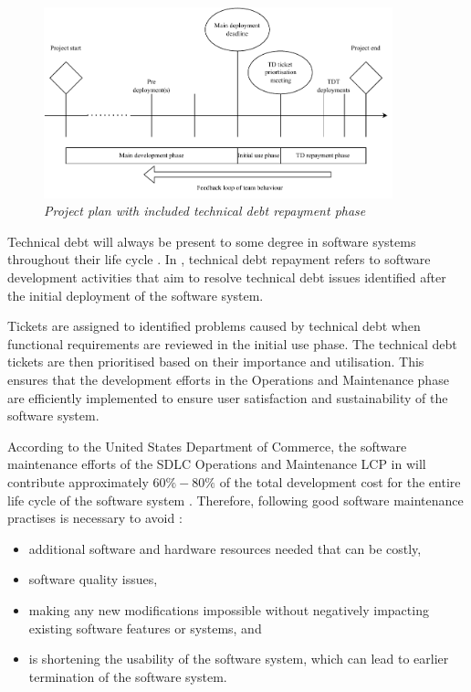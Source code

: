 \begin{figure}[!htb]
	\centering %
	\includegraphics[width=0.9\textwidth]{img/Chapter1/TD_repayment/TD_repayment.pdf}
	\caption[Project plan with included technical debt repayment phase]
	{\textit{Project plan with included technical debt repayment phase \cite{Wiese2021}}}\label{fig:ch1_tdRepayment}
\end{figure} 

Technical debt will always be present to some degree in software systems throughout their life cycle \cite{Wiese2021}. In , technical debt repayment refers to software development activities that aim to resolve technical debt issues identified after the initial deployment of the software system.\par Tickets are assigned to identified problems caused by technical debt when functional requirements are reviewed in the initial use phase. The technical debt tickets are then prioritised based on their importance and utilisation. This ensures that the development efforts in the Operations and Maintenance phase are efficiently implemented to ensure user satisfaction and sustainability of the software system.\par According to the United States Department of Commerce, the software maintenance efforts of the SDLC Operations and Maintenance LCP in  will contribute approximately $60\%-80\%$ of the total development cost for the entire life cycle of the software system \cite{Ogheneovo2014, Ackermann2009, Tang2010}. Therefore, following good software maintenance practises is necessary to avoid \cite{DeLeon-Sigg2020}:

\begin{itemize}
	\item additional software and hardware resources needed that can be costly,
	\item software quality issues,
	\item making any new modifications impossible without negatively impacting existing software features or systems, and
	\item is shortening the usability of the software system, which can lead to earlier termination of the software system.
\end{itemize}

